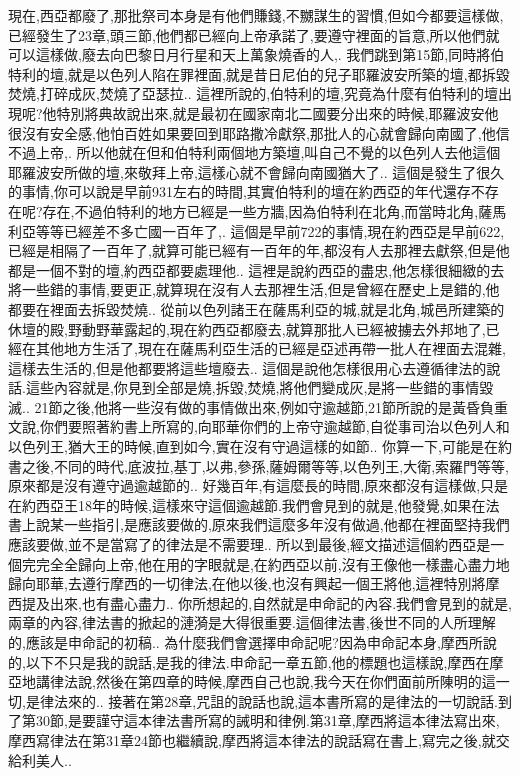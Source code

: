\documentclass{book}
\begin{document}
現在,西亞都廢了,那批祭司本身是有他們賺錢,不嬲謀生的習慣,但如今都要這樣做,已經發生了23章,頭三節,他們都已經向上帝承諾了,要遵守裡面的旨意,所以他們就可以這樣做,廢去向巴黎日月行星和天上萬象燒香的人,.
我們跳到第15節,同時將伯特利的壇,就是以色列人陷在罪裡面,就是昔日尼伯的兒子耶羅波安所築的壇,都拆毀焚燒,打碎成灰,焚燒了亞瑟拉..
這裡所說的,伯特利的壇,究竟為什麼有伯特利的壇出現呢?他特別將典故說出來,就是最初在國家南北二國要分出來的時候,耶羅波安他很沒有安全感,他怕百姓如果要回到耶路撒冷獻祭,那批人的心就會歸向南國了,他信不過上帝,.
所以他就在但和伯特利兩個地方築壇,叫自己不覺的以色列人去他這個耶羅波安所做的壇,來敬拜上帝,這樣心就不會歸向南國猶大了..
這個是發生了很久的事情,你可以說是早前931左右的時間,其實伯特利的壇在約西亞的年代還存不存在呢?存在,不過伯特利的地方已經是一些方牆,因為伯特利在北角,而當時北角,薩馬利亞等等已經差不多亡國一百年了,.
這個是早前722的事情,現在約西亞是早前622,已經是相隔了一百年了,就算可能已經有一百年的年,都沒有人去那裡去獻祭,但是他都是一個不對的壇,約西亞都要處理他..
這裡是說約西亞的盡忠,他怎樣很細緻的去將一些錯的事情,要更正,就算現在沒有人去那裡生活,但是曾經在歷史上是錯的,他都要在裡面去拆毀焚燒..
從前以色列諸王在薩馬利亞的城,就是北角,城邑所建築的休壇的殿,野動野華露起的,現在約西亞都廢去,就算那批人已經被擄去外邦地了,已經在其他地方生活了,現在在薩馬利亞生活的已經是亞述再帶一批人在裡面去混雜,這樣去生活的,但是他都要將這些壇廢去..
這個是說他怎樣很用心去遵循律法的說話.這些內容就是,你見到全部是燒,拆毀,焚燒,將他們變成灰,是將一些錯的事情毀滅..
21節之後,他將一些沒有做的事情做出來,例如守逾越節,21節所說的是黃昏負重文說,你們要照著約書上所寫的,向耶華你們的上帝守逾越節,自從事司治以色列人和以色列王,猶大王的時候,直到如今,實在沒有守過這樣的如節..
你算一下,可能是在約書之後,不同的時代,底波拉,基丁,以弗,參孫,薩姆爾等等,以色列王,大衛,索羅門等等,原來都是沒有遵守過逾越節的..
好幾百年,有這麼長的時間,原來都沒有這樣做,只是在約西亞王18年的時候,這樣來守這個逾越節.我們會見到的就是,他發覺,如果在法書上說某一些指引,是應該要做的,原來我們這麼多年沒有做過,他都在裡面堅持我們應該要做,並不是當寫了的律法是不需要理..
所以到最後,經文描述這個約西亞是一個完完全全歸向上帝,他在用的字眼就是,在約西亞以前,沒有王像他一樣盡心盡力地歸向耶華,去遵行摩西的一切律法,在他以後,也沒有興起一個王將他,這裡特別將摩西提及出來,也有盡心盡力..
你所想起的,自然就是申命記的內容.我們會見到的就是,兩章的內容,律法書的掀起的漣漪是大得很重要.這個律法書,後世不同的人所理解的,應該是申命記的初稿..
為什麼我們會選擇申命記呢?因為申命記本身,摩西所說的,以下不只是我的說話,是我的律法.申命記一章五節,他的標題也這樣說,摩西在摩亞地講律法說,然後在第四章的時候,摩西自己也說,我今天在你們面前所陳明的這一切,是律法來的..
接著在第28章,咒詛的說話也說,這本書所寫的是律法的一切說話.到了第30節,是要謹守這本律法書所寫的誡明和律例.第31章,摩西將這本律法寫出來,摩西寫律法在第31章24節也繼續說,摩西將這本律法的說話寫在書上,寫完之後,就交給利美人..
\end{document}
